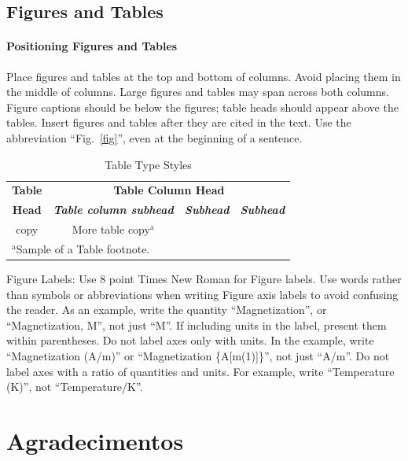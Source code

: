 \documentclass[conference]{IEEEtran}
\begin{document}
\subsection{Figures and Tables}
\paragraph{Positioning Figures and Tables} Place figures and tables at the top and
bottom of columns. Avoid placing them in the middle of columns. Large
figures and tables may span across both columns. Figure captions should be
below the figures; table heads should appear above the tables. Insert
figures and tables after they are cited in the text. Use the abbreviation
``Fig.~\ref{fig}'', even at the beginning of a sentence.

\begin{table}[htbp]
    \caption{Table Type Styles}
    \begin{center}
        \begin{tabular}{|c|c|c|c|}
            \hline
            \textbf{Table} & \multicolumn{3}{|c|}{\textbf{Table Column Head}}                                                         \\
            \cline{2-4}
            \textbf{Head}  & \textbf{\textit{Table column subhead}}           & \textbf{\textit{Subhead}} & \textbf{\textit{Subhead}} \\
            \hline
            copy           & More table copy$^{\mathrm{a}}$                   &                           &                           \\
            \hline
            \multicolumn{4}{l}{$^{\mathrm{a}}$Sample of a Table footnote.}
        \end{tabular}
        \label{tab1}
    \end{center}
\end{table}

Figure Labels: Use 8 point Times New Roman for Figure labels. Use words
rather than symbols or abbreviations when writing Figure axis labels to
avoid confusing the reader. As an example, write the quantity
``Magnetization'', or ``Magnetization, M'', not just ``M''. If including
units in the label, present them within parentheses. Do not label axes only
with units. In the example, write ``Magnetization (A/m)'' or ``Magnetization
\{A[m(1)]\}'', not just ``A/m''. Do not label axes with a ratio of
quantities and units. For example, write ``Temperature (K)'', not
``Temperature/K''.


\section*{Agradecimentos}
\end{document}

